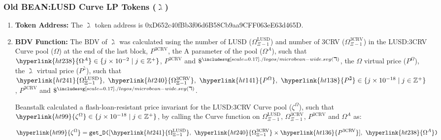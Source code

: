 \documentclass[class=article, crop=false]{standalone}
\begin{document}
\subsubsection{Old BEAN:LUSD Curve LP Tokens ($\gimel$)}

\begin{enumerate}
    \item \textbf{Token Address:} The \hyperlink{ht108}{$\gimel$} token address is 0xD652c40fBb3f06d6B58Cb9aa9CFF063eE63d465D.
    
    \item \textbf{BDV Function:} The BDV of \hyperlink{ht108}{$\gimel$} was calculated using the number of LUSD (\hyperlink{ht241}{$\Omega_{\Xi-1}^{\text{LUSD}}$}) and number of 3CRV (\hyperlink{ht240}{$\Omega_{\Xi-1}^{\text{3CRV}}$}) in the LUSD:3CRV Curve pool (\hyperlink{ht237}{$\Omega$}) at the end of the last block, \hyperlink{ht136}{$P^{\text{3CRV}}$}, the A parameter of the pool (\hyperlink{ht238}{$\Omega^{A}$}), such that $\hyperlink{ht238}{\Omega^{A}} \in \{j \times 10^{-2} \mid j \in \mathbb{Z}^{+} \}$, \hyperlink{ht136}{$P^{\text{3CRV}}$} and \hyperlink{ht1a}{$\$^{\bean(\daleth)}$}, the \hyperlink{ht237}{$\Omega$} virtual price (\hyperlink{ht141}{$P^{\Omega}$}), the \hyperlink{ht108}{$\gimel$} virtual price (\hyperlink{ht138}{$P^{\gimel}$}), such that $\hyperlink{ht241}{\Omega_{\Xi-1}^{\text{LUSD}}},\ \hyperlink{ht240}{\Omega_{\Xi-1}^{\text{3CRV}}},\ \hyperlink{ht141}{P^{\Omega}},\ \hyperlink{ht138}{P^{\gimel}} \in \{j \times 10^{-18} \mid j \in \mathbb{Z}^{+} \}$, \hyperlink{ht136}{$P^{\text{3CRV}}$} and \hyperlink{ht1a}{$\$^{\bean(\daleth)}$}. 

        Beanstalk calculated a flash-loan-resistant price invariant for the LUSD:3CRV Curve pool (\hyperlink{ht99}{$\zeta^{\Omega}$}), such that $\hyperlink{ht99}{\zeta^{\Omega}} \in \{j \times 10^{-18} \mid j \in \mathbb{Z}^{+} \}$, by calling the Curve  function on \hyperlink{ht241}{$\Omega_{\Xi-1}^{\text{LUSD}}$}, \hyperlink{ht240}{$\Omega_{\Xi-1}^{\text{3CRV}}$}, \hyperlink{ht136}{$P^{\text{3CRV}}$} and \hyperlink{ht238}{$\Omega^{A}$} as:
        
            $$
                \hyperlink{ht99}{\zeta^{\Omega}} = 
                    \code{get\_D(}[\hyperlink{ht241}{\Omega_{\Xi-1}^{\text{LUSD}}},\ 
                            \hyperlink{ht240}{\Omega_{\Xi-1}^{\text{3CRV}}} \times 
                                \hyperlink{ht136}{P^{\text{3CRV}}}],\ 
                        \hyperlink{ht238}{\Omega^{A}}\code{)}
            $$
            

\end{enumerate}
\end{document}
